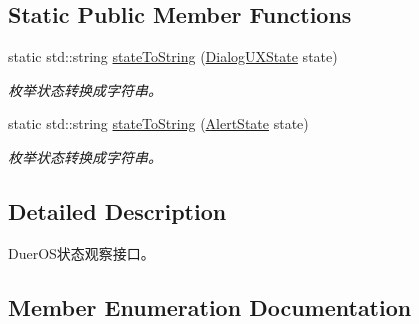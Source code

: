 \subsection*{Static Public Member Functions}
\begin{DoxyCompactItemize}
\item 
static std\+::string \hyperlink{classduerOSDcsSDK_1_1sdkInterfaces_1_1DialogUXStateObserverInterface_a92870093ce3de85233e4e7b098c94185}{state\+To\+String} (\hyperlink{classduerOSDcsSDK_1_1sdkInterfaces_1_1DialogUXStateObserverInterface_abbcd31d45f9112289ba73c574bf191cd}{Dialog\+U\+X\+State} state)
\begin{DoxyCompactList}\small\item\em 枚举状态转换成字符串。 \end{DoxyCompactList}\item 
static std\+::string \hyperlink{classduerOSDcsSDK_1_1sdkInterfaces_1_1DialogUXStateObserverInterface_aa80a09873abe1e5f805594deb2a38afa}{state\+To\+String} (\hyperlink{classduerOSDcsSDK_1_1sdkInterfaces_1_1DialogUXStateObserverInterface_ac45d1c6a17f061837ace6a4aeff9cc46}{Alert\+State} state)
\begin{DoxyCompactList}\small\item\em 枚举状态转换成字符串。 \end{DoxyCompactList}\end{DoxyCompactItemize}


\subsection{Detailed Description}
Duer\+O\+S状态观察接口。 

\subsection{Member Enumeration Documentation}
\mbox{\label{classduerOSDcsSDK_1_1sdkInterfaces_1_1DialogUXStateObserverInterface_ac45d1c6a17f061837ace6a4aeff9cc46}} 
